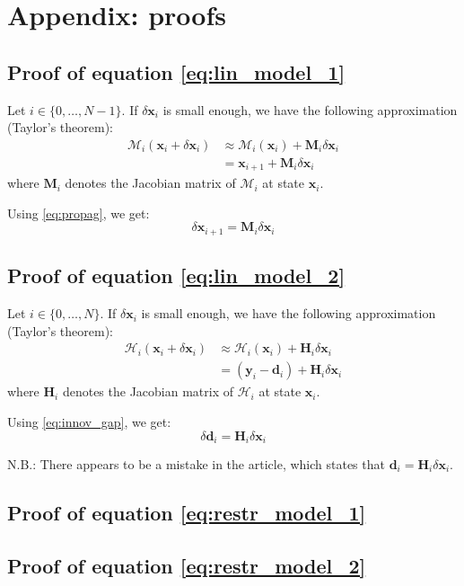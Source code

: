 \documentclass[a4paper,10pt]{article}
\newcommand{\MM}{\mathcal M}
\newcommand{\MH}{\mathcal H}
\newcommand{\BH}{{\mathbf H}}
\newcommand{\BM}{{\mathbf M}}
\newcommand{\bx}{{\boldsymbol x}}
\newcommand{\by}{{\boldsymbol y}}
\newcommand{\bd}{{\boldsymbol d}}
\newcommand{\dx}{\delta \bx}
\newcommand{\dd}{\delta \bd}
\newcommand{\izton}{i \in \{0, \dots, N\}}
\newcommand{\iztonn}{i \in \{0, \dots, N-1\}}
\begin{document}
\section{Appendix: proofs}

\subsection*{Proof of equation \eqref{eq:lin_model_1}}

Let $\iztonn$. If $\dx_i$ is small enough, we have the following approximation (Taylor's theorem):
\begin{equation*}
\begin{split}
	\MM_i(\bx_i + \dx_i)
		& \approx \MM_i(\bx_i) + \BM_i \dx_i \\
		& = \bx_{i+1} + \BM_i \dx_i
\end{split}
\end{equation*}
where $\BM_i$ denotes the Jacobian matrix of $\MM_i$ at state $\bx_i$.

Using \eqref{eq:propag}, we get:
\begin{equation*}
	\dx_{i+1} = \BM_i \dx_i
\end{equation*}

\subsection*{Proof of equation \eqref{eq:lin_model_2}}

Let $\izton$. If $\dx_i$ is small enough, we have the following approximation (Taylor's theorem):
\begin{equation*}
\begin{split}
	\MH_i(\bx_i + \dx_i)
		& \approx \MH_i(\bx_i) + \BH_i \dx_i \\
		& = (\by_i - \bd_i) + \BH_i \dx_i
\end{split}
\end{equation*}
where $\BH_i$ denotes the Jacobian matrix of $\MH_i$ at state $\bx_i$.

Using \eqref{eq:innov_gap}, we get:
\begin{equation*}
\dd_i = \BH_i \dx_i
\end{equation*}

N.B.: There appears to be a mistake in the article, which states that $\bd_i = \BH_i \dx_i$.

\subsection*{Proof of equation \eqref{eq:restr_model_1}}

\subsection*{Proof of equation \eqref{eq:restr_model_2}}



\end{document}
